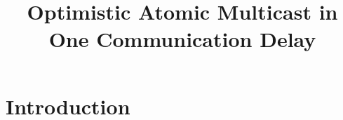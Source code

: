 \documentclass[times, 10pt]{article}
\begin{document}
\newcommand{\mv}[1]{\ensuremath{\operatorname{\mathit{#1}}}}
\newcommand{\bc}[1]{\textcolor{dark}{#1}}
\newtheorem{lems}{Lemma}
\newtheorem{props}{Proposition}
\newtheorem{thms}{Theorem}
\newtheorem{defs}{Definition}
\newtheorem{obs}{Observation}

\newcommand{\code}[1]{\texttt{\small{\textbf{#1}}}}

\newcommand{\blankline}{\vspace{4 mm}}
\newcommand{\amcast}{\mbox{multicast}}
\newcommand{\amdel}{\mbox{deliver}}
\newcommand{\amdelarg}[1]{\mbox{\amdel({#1})}}
\newcommand{\amcastarg}[1]{\mbox{\amcast({#1})}}
\newcommand{\tconsm}{T_{cons}}
\newcommand{\tcons}{\mbox{$\tconsm$}}
\newcommand{\opt}{\mbox{opt-deliver}}
\newcommand{\cons}{\mbox{deliver}}
\newcommand{\rmcast}{\mbox{fr-mcast}}
\newcommand{\rmdel}{\mbox{fr-deliver}}
\newcommand{\optdel}[1]{\mbox{\opt({#1})}}
\newcommand{\consdel}[1]{\mbox{\cons({#1})}}
\newcommand{\rmcastarg}[2]{\mbox{\rmcast({#1},{#2})}}
\newcommand{\rmdelarg}[1]{\mbox{\rmdel({#1})}}

\newcommand{\localmsgs}{messages\text{$_g$}}
\newcommand{\decided}{decided\text{$_g$}}
\newcommand{\stamped}{stamped}
\newcommand{\delivered}{delivered}%


\title{Optimistic Atomic Multicast in One Communication Delay}


\maketitle

\begin{abstract}

\end{abstract}

\section{Introduction}
\label{sec:intro}
\end{document}
